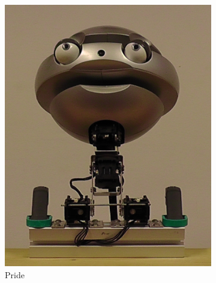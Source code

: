 \begin{figure}[ht]
\begin{subfigure}{0.2\columnwidth}
        \includegraphics[width=\columnwidth]{images/gbe/pride.jpg}
        \caption{Pride}
    \end{subfigure}
    \begin{subfigure}{0.2\columnwidth}

\end{subfigure}
\end{figure}

